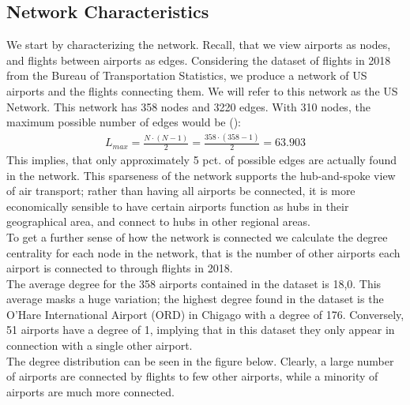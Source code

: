 \label{sec:empirical}
\subsection{Network Characteristics}
We start by characterizing the network. Recall, that we view airports as nodes, and flights between airports as edges. Considering the dataset of flights in 2018 from the Bureau of Transportation Statistics, we produce a network of US airports and the flights connecting them. We will refer to this network as the US Network. This network has 358 nodes and 3220 edges. With 310 nodes, the maximum possible number of edges would be (\cite{Barabasi Networks}): 
\begin{align}
    L_{max}  = \frac{N\cdot(N-1)}{2}=\frac{358\cdot(358-1)}{2} = 63.903
\end{align}
This implies, that only approximately 5 pct. of possible edges are actually found in the network. 
This sparseness of the network supports the hub-and-spoke view of air transport; rather than having all airports be connected, it is more economically sensible to have certain airports function as hubs in their geographical area, and connect to hubs in other regional areas. \\ 
To get a further sense of how the network is connected we calculate the degree centrality for each node in the network, that is the number of other airports each airport is connected to through flights in 2018. \\
The average degree for the 358 airports contained in the dataset is 18,0. This average masks a huge variation; the highest degree found in the dataset is the O'Hare International Airport (ORD) in Chigago with a degree of 176.  Conversely, 51 airports have a degree of 1, implying that in this dataset they only appear in connection with a single other airport. \\
The degree distribution can be seen in the figure below. Clearly, a large number of airports are connected by flights to few other airports, while a minority of airports are much more connected.


